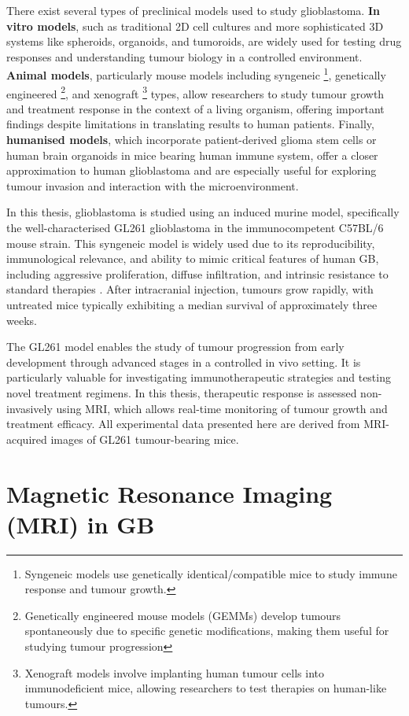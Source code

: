 \documentclass[12pt, a4paper]{report}
\begin{document}
There exist several types of preclinical models used to study glioblastoma. \textbf{In vitro models}, such as traditional 2D cell cultures and more sophisticated 3D systems like spheroids, organoids, and tumoroids, are widely used for testing drug responses and understanding tumour biology in a controlled environment. \textbf{Animal models}, particularly mouse models including syngeneic \footnote{Syngeneic models use genetically identical/compatible mice to study immune response and tumour growth.}, genetically engineered \footnote{Genetically engineered mouse models (GEMMs) develop tumours spontaneously due to specific genetic modifications, making them useful for studying tumour progression}, and xenograft \footnote{Xenograft models involve implanting human tumour cells into immunodeficient mice, allowing researchers to test therapies on human-like tumours.} types, allow researchers to study tumour growth and treatment response in the context of a living organism, offering important findings despite limitations in translating results to human patients. Finally, \textbf{humanised models}, which incorporate patient-derived glioma stem cells or human brain organoids in mice bearing human immune system, offer a closer approximation to human glioblastoma and are especially useful for exploring tumour invasion and interaction with the microenvironment.

In this thesis, glioblastoma is studied using an induced murine model, specifically the well-characterised GL261 glioblastoma in the immunocompetent C57BL/6 mouse strain. This syngeneic model is widely used due to its reproducibility, immunological relevance, and ability to mimic critical features of human GB, including aggressive proliferation, diffuse infiltration, and intrinsic resistance to standard therapies \cite{Liu2021}. After intracranial injection, tumours grow rapidly, with untreated mice typically exhibiting a median survival of approximately three weeks.

The GL261 model enables the study of tumour progression from early development through advanced stages in a controlled in vivo setting. It is particularly valuable for investigating immunotherapeutic strategies and testing novel treatment regimens. In this thesis, therapeutic response is assessed non-invasively using MRI, which allows real-time monitoring of tumour growth and treatment efficacy. All experimental data presented here are derived from MRI-acquired images of GL261 tumour-bearing mice.

\section{Magnetic Resonance Imaging (MRI) in GB}
\end{document}
